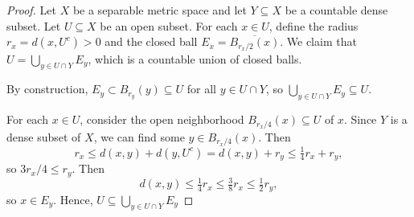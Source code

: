 \documentclass[12pt]{article}
\newcommand{\<}{\langle}
\renewcommand{\>}{\rangle}
\newcommand{\clo}{\overline}
\begin{document}
\begin{proof}
    Let $X$ be a separable metric space and let $Y \subseteq X$ be a countable dense subset. Let $U \subseteq X$ be an open subset. For each $x \in U$, define the radius $r_x = d(x, U^c) > 0$ and the closed ball $E_x = \clo{B_{r_x/2}(x)}$. We claim that $U = \bigcup_{y \in U \cap Y} E_y$, which is a countable union of closed balls.

    By construction, $E_y \subset B_{r_y}(y) \subseteq U$ for all $y \in U \cap Y$, so $\bigcup_{y \in U \cap Y} E_y \subseteq U$.

    For each $x \in U$, consider the open neighborhood $B_{r_x/4}(x) \subseteq U$ of $x$. Since $Y$ is a dense subset of $X$, we can find some $y \in B_{r_x/4}(x)$. Then
    \[
        r_x
            \leq d(x, y) + d(y, U^c) 
            = d(x, y) + r_y
            \leq \tfrac{1}{4}r_x + r_y,
    \]
    so $3r_x/4 \leq r_y$. Then
    \[
        d(x, y)
            \leq \tfrac{1}{4}r_x
            \leq \tfrac{3}{8}r_x
            \leq \tfrac{1}{2}r_y,
    \]
    so $x \in E_y$. Hence, $U \subseteq \bigcup_{y \in U \cap Y} E_y$

\end{proof}
\end{document}
